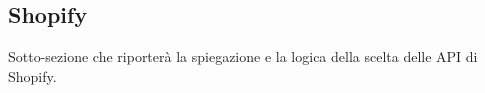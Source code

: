 \subsection{Shopify}

Sotto-sezione che riporterà la spiegazione e la logica della scelta delle API di Shopify.